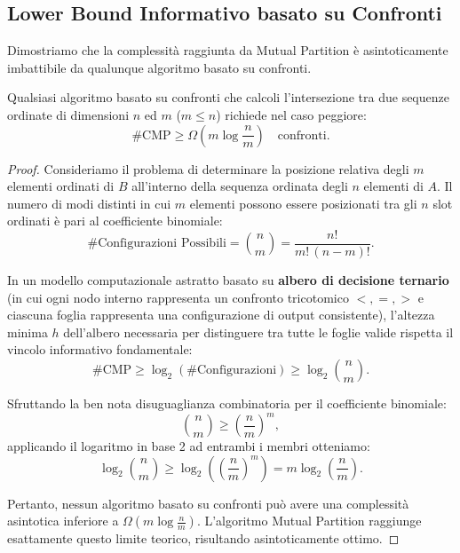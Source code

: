 \subsection{Lower Bound Informativo basato su Confronti}
Dimostriamo che la complessità raggiunta da Mutual Partition è asintoticamente imbattibile da qualunque algoritmo basato su confronti.

\begin{theorem}
Qualsiasi algoritmo basato su confronti che calcoli l'intersezione tra due sequenze ordinate di dimensioni $n$ ed $m$ ($m \le n$) richiede nel caso peggiore:
\begin{equation}
  \#\text{CMP} \ge \Omega\left(m \log \frac{n}{m}\right) \quad \text{confronti}.
\end{equation}
\end{theorem}
\begin{proof}
Consideriamo il problema di determinare la posizione relativa degli $m$ elementi ordinati di $B$ all'interno della sequenza ordinata degli $n$ elementi di $A$. Il numero di modi distinti in cui $m$ elementi possono essere posizionati tra gli $n$ slot ordinati è pari al coefficiente binomiale:
\begin{equation}
  \#\text{Configurazioni Possibili} = \binom{n}{m} = \frac{n!}{m! \, (n - m)!}.
\end{equation}

In un modello computazionale astratto basato su \textbf{albero di decisione ternario} (in cui ogni nodo interno rappresenta un confronto tricotomico $<, =, >$ e ciascuna foglia rappresenta una configurazione di output consistente), l'altezza minima $h$ dell'albero necessaria per distinguere tra tutte le foglie valide rispetta il vincolo informativo fondamentale:
\begin{equation}
  \#\text{CMP} \ge \log_2(\#\text{Configurazioni}) \ge \log_2 \binom{n}{m}.
\end{equation}

Sfruttando la ben nota disuguaglianza combinatoria per il coefficiente binomiale:
\begin{equation}
  \binom{n}{m} \ge \left(\frac{n}{m}\right)^m,
\end{equation}
applicando il logaritmo in base 2 ad entrambi i membri otteniamo:
\begin{equation}
  \log_2 \binom{n}{m} \ge \log_2 \left(\left(\frac{n}{m}\right)^m\right) = m \log_2 \left(\frac{n}{m}\right).
\end{equation}

Pertanto, nessun algoritmo basato su confronti può avere una complessità asintotica inferiore a $\Omega\left(m \log \frac{n}{m}\right)$. L'algoritmo Mutual Partition raggiunge esattamente questo limite teorico, risultando asintoticamente ottimo.
\end{proof}

